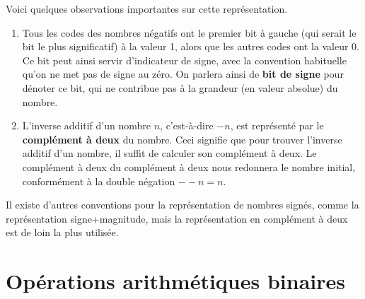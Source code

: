 \documentclass[letter, oneside]{book}
\begin{document}
Voici quelques observations importantes sur cette représentation.

\begin{enumerate}
\item Tous les codes des nombres négatifs ont le premier bit à gauche
(qui serait le bit le plus significatif) à la valeur 1, alors que
les autres codes ont la valeur 0. Ce bit peut ainsi servir
d'indicateur de signe, avec la convention habituelle qu'on ne met
pas de signe au zéro. On parlera ainsi de \textbf{bit de signe} pour
dénoter ce bit, qui ne contribue pas à la grandeur (en valeur
absolue) du nombre.

\item L'inverse additif d'un nombre \(n\), c'est-à-dire \(-n\), est
représenté par le \textbf{complément à deux} du nombre. Ceci signifie que
pour trouver l'inverse additif d'un nombre, il suffit de calculer
son complément à deux. Le complément à deux du complément à deux nous
redonnera le nombre initial, conformément à la double négation
\(--n = n\).
\end{enumerate}

Il existe d'autres conventions pour la représentation de nombres
signés, comme la représentation signe+magnitude, mais la
représentation en complément à deux est de loin la plus utilisée.

\section{Opérations arithmétiques binaires}
\label{sec:orgcf0a2ba}
\end{document}
